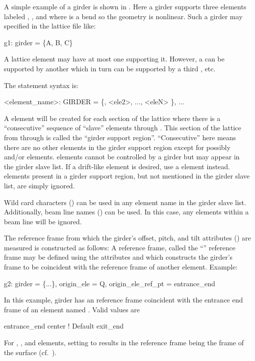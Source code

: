 A simple example of a girder is shown in . Here a girder
supports three elements labeled , , and  where
 is a bend so the geometry is nonlinear. Such a girder may
specified in the lattice file like:
\begin{example}
  g1: girder = \{A, B, C\}
\end{example}
A lattice element may have at most one  supporting it. However, 
a  can be supported by another  which in turn can
be supported by a third , etc.

The  statement syntax is:
\begin{example}
  <element_name>: GIRDER = \{<ele1>, <ele2>, ..., <eleN> \}, ...
\end{example}
A  element will be created for each section of the lattice
where there is a ``consecutive'' sequence of ``slave'' elements
 through .  This section of the lattice from
 through  is called the ``girder support
region''.  ``Consecutive'' here means there are no other elements in the
girder support region except for possibly  and/or 
elements.   elements cannot be controlled by a girder but may
appear in the girder slave list. If a drift-like element is
desired, use a  element instead.  elements present
in a girder support region, but not mentioned in the girder slave
list, are simply ignored.

Wild card characters () can be used in any element
name in the girder slave list. Additionally, beam line names
() can be used. In this case, any  elements
within a beam line will be ignored.

The reference frame from which the girder's offset, pitch, and tilt
attributes () are measured is constructed as follows: A
reference frame, called the ``'' reference frame may be
defined using the attributes  and
 which constructs the girder's
 frame to be coincident with the reference frame of another
element. Example:
\begin{example}
  g2: girder = \{...\}, origin_ele = Q, origin_ele_ref_pt = entrance_end
\end{example}
In this example, girder  has an  reference frame
coincident with the entrance end frame of an element named
. Valid values are
\begin{example}
  entrance_end
  center        ! Default
  exit_end
\end{example}
For , , and  elements,
setting  to  results in the reference
frame being the frame of the surface (cf.~).

